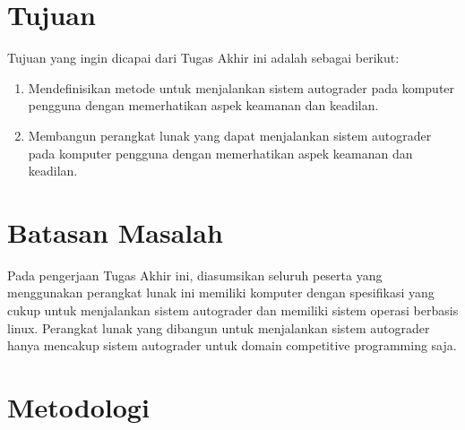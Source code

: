 \section{Tujuan}

\par Tujuan yang ingin dicapai dari Tugas Akhir ini adalah sebagai berikut:
\begin{enumerate}
	\item Mendefinisikan metode untuk menjalankan sistem autograder pada komputer pengguna dengan memerhatikan aspek keamanan dan keadilan.
	\item Membangun perangkat lunak yang dapat menjalankan sistem autograder pada komputer pengguna dengan memerhatikan aspek keamanan dan keadilan.
\end{enumerate}

\section{Batasan Masalah}

\par Pada pengerjaan Tugas Akhir ini, diasumsikan seluruh peserta yang menggunakan perangkat lunak ini memiliki komputer dengan spesifikasi yang cukup untuk menjalankan sistem autograder dan memiliki sistem operasi berbasis linux. Perangkat lunak yang dibangun untuk menjalankan sistem autograder hanya mencakup sistem autograder untuk domain competitive programming saja.

\section{Metodologi}

